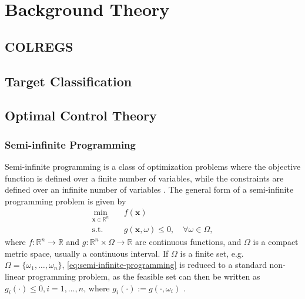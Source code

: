 
\chapter{Background Theory}\label{chap:background-theory}

\section{COLREGS}\label{sec:colregs}

\section{Target Classification}

\section{Optimal Control Theory}
\subsection{Semi-infinite Programming}\label{sec:semi-infinite-programming}

Semi-infinite programming is a class of optimization problems where the objective function is defined over a finite number of variables, while the constraints are defined over an infinite number of variables \citep{Bonnans2013-gt}. The general form of a semi-infinite programming problem is given by
\begin{equation}\label{eq:semi-infinite-programming}
    \begin{aligned}
        \min_{\mathbf x \in \mathbb R^n} \quad & f(\mathbf x) \\
        \text{s.t.} \quad & g(\mathbf x, \omega) \leq 0, \quad \forall \omega \in \Omega,
    \end{aligned}
\end{equation}
where $f : \mathbb R^n \to \mathbb R$ and $g : \mathbb R^n \times \Omega \to \mathbb R$ are continuous functions, and $\Omega$ is a compact metric space, usually a continuous interval. If $\Omega$ is a finite set, e.g. $\Omega = \{\omega_1,\ldots,\omega_n\}$, \cref{eq:semi-infinite-programming} is reduced to a standard non-linear programming problem, as the feasible set can then be written as $g_i(\cdot) \leq 0, i = 1,\ldots,n$, where $g_i(\cdot) := g(\cdot, \omega_i)$ \citep{Bonnans2013-gt}.

